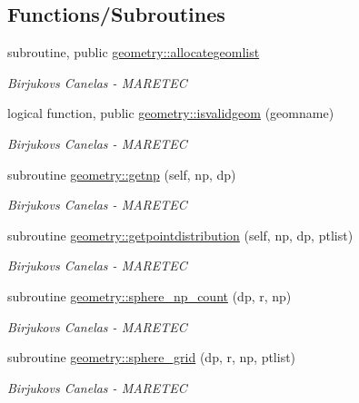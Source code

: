 \subsection*{Functions/\+Subroutines}
\begin{DoxyCompactItemize}
\item 
subroutine, public \mbox{\hyperlink{namespacegeometry_a17652db20fde3f883b4fc778e0e6cdda}{geometry\+::allocategeomlist}}
\begin{DoxyCompactList}\small\item\em Birjukovs Canelas -\/ M\+A\+R\+E\+T\+EC \end{DoxyCompactList}\item 
logical function, public \mbox{\hyperlink{namespacegeometry_a56488a00edf7ba4e670ceffd5c36f13f}{geometry\+::isvalidgeom}} (geomname)
\begin{DoxyCompactList}\small\item\em Birjukovs Canelas -\/ M\+A\+R\+E\+T\+EC \end{DoxyCompactList}\item 
subroutine \mbox{\hyperlink{namespacegeometry_ad14d7800ac13b9a6722ac96b06ce94c9}{geometry\+::getnp}} (self, np, dp)
\begin{DoxyCompactList}\small\item\em Birjukovs Canelas -\/ M\+A\+R\+E\+T\+EC \end{DoxyCompactList}\item 
subroutine \mbox{\hyperlink{namespacegeometry_a726dae6e63f052138bd3346de439fbc4}{geometry\+::getpointdistribution}} (self, np, dp, ptlist)
\begin{DoxyCompactList}\small\item\em Birjukovs Canelas -\/ M\+A\+R\+E\+T\+EC \end{DoxyCompactList}\item 
subroutine \mbox{\hyperlink{namespacegeometry_a4f070ef95bffe3bbb21bd251ae5ca6c7}{geometry\+::sphere\+\_\+np\+\_\+count}} (dp, r, np)
\begin{DoxyCompactList}\small\item\em Birjukovs Canelas -\/ M\+A\+R\+E\+T\+EC \end{DoxyCompactList}\item 
subroutine \mbox{\hyperlink{namespacegeometry_a9629040285de7053d42f434333528702}{geometry\+::sphere\+\_\+grid}} (dp, r, np, ptlist)
\begin{DoxyCompactList}\small\item\em Birjukovs Canelas -\/ M\+A\+R\+E\+T\+EC \end{DoxyCompactList}\item 

\end{DoxyCompactItemize}
